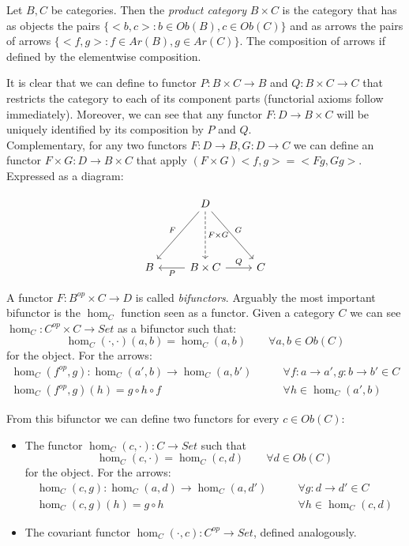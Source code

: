 \begin{definition}
  Let $B,C$ be categories. Then the \emph{product category} $B\times C$ is the category that has as objects the pairs $\{<b,c>: b \in Ob(B), c\in Ob(C)\}$ and as arrows the pairs of arrows $\{<f,g>: f \in Ar(B), g\in Ar(C)\}$. The composition of arrows if defined by the elementwise composition. 
\end{definition}

It is clear that we can define to functor $P: B\times C \to B$ and $Q: B \times C \to C$ that restricts the category to each of its component parts (functorial axioms follow immediately). Moreover, we can see that any functor $F:D\to B\times C$ will be uniquely identified by its composition by $P$ and $Q$.\\

Complementary, for any two functors $F:D\to B, G:D\to C$ we can define an functor $F \times G : D \to B\times C$ that apply $(F\times G) <f,g> = <Fg, Gg>$. Expressed as a diagram: 

\[
\begin{tikzcd}
  {} & D
  \arrow[swap, "F"]{ddl}
  \arrow[dashed, "F\times G"]{dd}
  \arrow["G"]{ddr}\\
  {} & \\
  B & B \times C
  \arrow["P"]{l}
  \arrow["Q"]{r} & C
\end{tikzcd}
\]

A functor $F: B^{op}\times C \to D$ is called \emph{bifunctors}. Arguably the most important bifunctor is the $\hom_C$ function seen as a functor. Given a category $C$ we can see $\hom_C: C^{op}\times C \to Set$ as a bifunctor such that:
\[
  \hom_C(\cdot,\cdot)(a,b) = \hom_C (a,b) \qquad \forall a,b \in Ob(C)
\]
for the object. For the arrows:
\begin{align*}
  \hom_C(f^{op},g): \hom_C (a',b)  \to \hom_C(a,b') &\qquad  \forall f:a\to a', g:b\to b' \in C\\
  \hom_C(f^{op},g) (h)   = g \circ h \circ f  &\qquad \forall  h\in \hom_C(a',b) 
\end{align*}

From this bifunctor we can define two functors for every $c\in Ob(C)$:
\begin{itemize}
\item  The functor $\hom_C(c, \cdot):C\to Set$ such that
  \[
  \hom_C(c,\cdot) = \hom_C (c,d) \qquad \forall d \in Ob(C)
\]
for the object. For the arrows:
\begin{align*}
 \hom_C(c,g): \hom_C (a,d)  \to \hom_C(a,d') &\qquad  \forall g:d\to d' \in C\\
  \hom_C(c,g) (h)   = g \circ h   &\qquad \forall  h\in \hom_C(c,d) 
\end{align*}

\item  The covariant functor $\hom_C(\cdot, c):C^{op}\to Set$, defined analogously.
\end{itemize}
